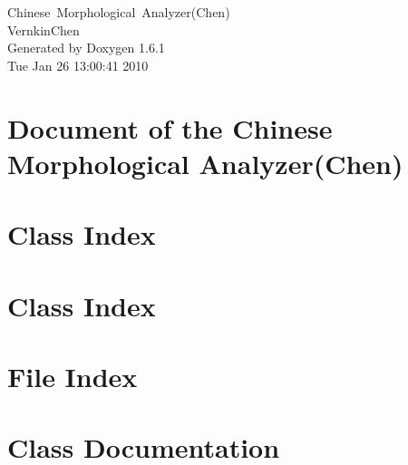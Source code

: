 \documentclass[a4paper]{book}
\begin{document}
\begin{titlepage}
\vspace*{7cm}
\begin{center}
{\Large Chinese~Morphological~Analyzer(Chen) \\[1ex]\large VernkinChen }\\
\vspace*{1cm}
{\large Generated by Doxygen 1.6.1}\\
\vspace*{0.5cm}
{\small Tue Jan 26 13:00:41 2010}\\
\end{center}
\end{titlepage}
\clearemptydoublepage
{}
\tableofcontents
\clearemptydoublepage
{}
\chapter{Document of the Chinese Morphological Analyzer(Chen)}
\label{index}
\chapter{Class Index}

\chapter{Class Index}

\chapter{File Index}

\chapter{Class Documentation}






































\end{document}
